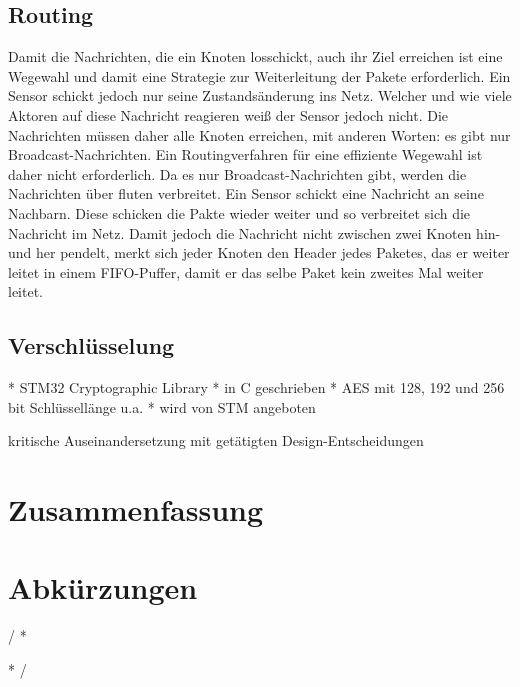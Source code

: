 \documentclass{IEEEtran}
\begin{document}
    \subsection{Routing}
        Damit die Nachrichten, die ein Knoten losschickt, auch ihr Ziel erreichen ist eine Wegewahl und damit eine Strategie zur Weiterleitung der Pakete erforderlich. Ein Sensor schickt jedoch nur seine Zustandsänderung ins Netz. Welcher und wie viele Aktoren auf diese Nachricht reagieren weiß der Sensor jedoch nicht. Die Nachrichten müssen daher alle Knoten erreichen, mit anderen Worten: es gibt nur Broadcast-Nachrichten. Ein Routingverfahren für eine effiziente Wegewahl ist daher nicht erforderlich.
        Da es nur Broadcast-Nachrichten gibt, werden die Nachrichten über fluten verbreitet. Ein Sensor schickt eine Nachricht an seine Nachbarn. Diese schicken die Pakte wieder weiter und so verbreitet sich die Nachricht im Netz. Damit jedoch die Nachricht nicht zwischen zwei Knoten hin- und her pendelt, merkt sich jeder Knoten den Header jedes Paketes, das er weiter leitet in einem FIFO-Puffer, damit er das selbe Paket kein zweites Mal weiter leitet.
        

    \subsection{Verschlüsselung}
        
        * STM32 Cryptographic Library
        * in C geschrieben
        * AES mit 128, 192 und 256 bit Schlüssellänge u.a.
        * wird von STM angeboten




kritische Auseinandersetzung mit getätigten Design-Entscheidungen

\section{Zusammenfassung}



\section*{Abkürzungen}
\renewcommand{\IEEEiedlistdecl}{\IEEEsetlabelwidth{CSMA/CA}}
\begin{acronym}
\end{acronym}
\renewcommand{\IEEEiedlistdecl}{\relax}%


\comment / *
\listoffigures
\clearpage

\listoftables
\clearpage
* /



\end{document}

